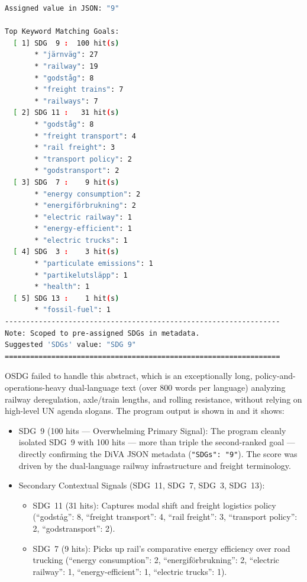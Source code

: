 \begin{casestudySection}
\begin{lstlisting}[language={bash}, basicstyle=\footnotesize, escapechar=|, breaklines=true,
    postbreak=\usebox{\lstbreakbox}, caption={Program's output}, label=lst:t_145010Output]
Assigned value in JSON: "9"

Top Keyword Matching Goals:
  [ 1] SDG  9 :  100 hit(s)
       * "järnväg": 27
       * "railway": 19
       * "godståg": 8
       * "freight trains": 7
       * "railways": 7
  [ 2] SDG 11 :   31 hit(s)
       * "godståg": 8
       * "freight transport": 4
       * "rail freight": 3
       * "transport policy": 2
       * "godstransport": 2
  [ 3] SDG  7 :    9 hit(s)
       * "energy consumption": 2
       * "energiförbrukning": 2
       * "electric railway": 1
       * "energy-efficient": 1
       * "electric trucks": 1
  [ 4] SDG  3 :    3 hit(s)
       * "particulate emissions": 1
       * "partikelutsläpp": 1
       * "health": 1
  [ 5] SDG 13 :    1 hit(s)
       * "fossil-fuel": 1
-----------------------------------------------------------------
Note: Scoped to pre-assigned SDGs in metadata.
Suggested 'SDGs' value: "SDG 9"
=================================================================
\end{lstlisting}

OSDG failed to handle this abstract, which is an exceptionally long, policy-and-operations-heavy dual-language text (over \num{800} words per language) analyzing railway deregulation, axle/train lengths, and rolling resistance, without relying on high-level UN agenda slogans. The program output is shown in  and it shows:
\begin{itemize}
    \item \gls{SDG}~9 (\num{100} hits --- Overwhelming Primary Signal): The program cleanly isolated \gls{SDG}~9 with \num{100} hits --- more than triple the second-ranked goal --- directly confirming the \gls{DiVA} \gls{JSON} metadata (\texttt{"SDGs": "9"}). The score was driven by the dual-language railway infrastructure and freight terminology.
    
    \item Secondary Contextual Signals (\gls{SDG}~11, \gls{SDG}~7, \gls{SDG}~3, \gls{SDG}~13):
    \begin{itemize}
        \item \gls{SDG}~11 (\num{31} hits): Captures modal shift and freight logistics policy (\enquote{\foreignlanguage{swedish}{godståg}}: 8, \enquote{freight transport}: 4, \enquote{rail freight}: 3, \enquote{transport policy}: 2, \enquote{\foreignlanguage{swedish}{godstransport}}: 2).
        
        \item \gls{SDG}~7 (\num{9} hits): Picks up rail's comparative energy efficiency over road trucking (\enquote{energy consumption}: 2, \enquote{\foreignlanguage{swedish}{energiförbrukning}}: 2, \enquote{electric railway}: 1, \enquote{energy-efficient}: 1, \enquote{electric trucks}: 1).
        

\end{itemize}
\end{itemize}
\end{casestudySection}
